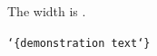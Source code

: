 \documentclass{ltxdoc}
\begin{document}
The width is \cmd\barwidth.

\texttt{\char`\{demonstration text\char`\}}
\end{document}
